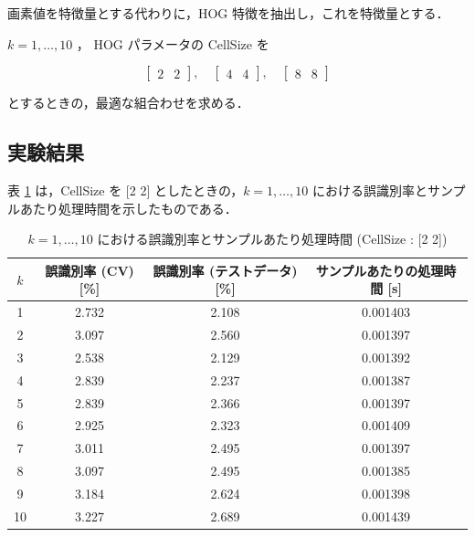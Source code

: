 \documentclass[fleqn, a4paper. 12pt]{jsarticle}
\begin{document}
      画素値を特徴量とする代わりに，HOG 特徴を抽出し，これを特徴量とする．

      $k = 1, \dots, 10$ ， HOG パラメータの CellSize を
      
      \[
      \begin{bmatrix}
      2 & 2
      \end{bmatrix}, \quad
      \begin{bmatrix}
      4 & 4
      \end{bmatrix}, \quad
      \begin{bmatrix}
      8 & 8
      \end{bmatrix}
      \]
      
      とするときの，最適な組合わせを求める．

    \subsection{実験結果}

      表 \ref{tab:2} は，CellSize を [2 2] としたときの，$k = 1, \dots, 10$ における誤識別率とサンプルあたり処理時間を示したものである．

      \begin{table}[p]
        \centering
        \caption{$k = 1, \dots, 10$ における誤識別率とサンプルあたり処理時間 (CellSize : [2 2])}
        \begin{tabular}{|c|c|c|c|}
          \hline
          $k$ & 誤識別率 (CV) [\%] & 誤識別率 (テストデータ) [\%] & サンプルあたりの処理時間 [s] \\
          \hline
          1  & 2.732 & 2.108 & 0.001403 \\
          2  & 3.097 & 2.560 & 0.001397 \\
          3  & 2.538 & 2.129 & 0.001392 \\
          4  & 2.839 & 2.237 & 0.001387 \\
          5  & 2.839 & 2.366 & 0.001397 \\
          6  & 2.925 & 2.323 & 0.001409 \\
          7  & 3.011 & 2.495 & 0.001397 \\
          8  & 3.097 & 2.495 & 0.001385 \\
          9  & 3.184 & 2.624 & 0.001398 \\
          10 & 3.227 & 2.689 & 0.001439 \\
          \hline
        \end{tabular}
        \label{tab:2}
      \end{table}
\end{document}
